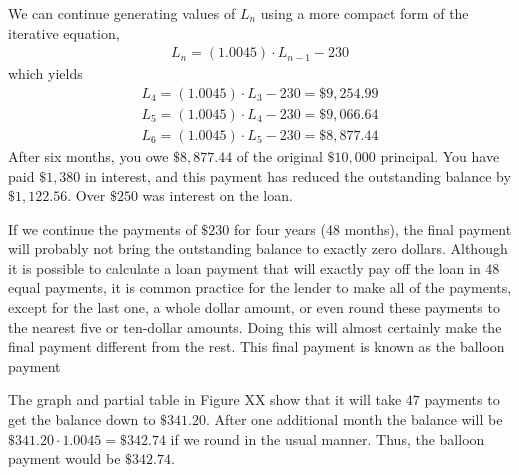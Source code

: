 \documentclass[10pt,]{book}
\theoremstyle{plain}
\theoremstyle{definition}
\theoremstyle{definition}
\theoremstyle{definition}
\numberwithin{equation}{section}
\begin{document}
\par
We can continue generating values of \(L_n\) using a more compact form of the iterative equation,%
%
\begin{gather*}
L_n=(1.0045)\cdot L_{n-1}-230
\end{gather*}
which yields%
%
\begin{gather*}
L_4=(1.0045)\cdot L_3-230=\$9,254.99\\
L_5=(1.0045)\cdot L_4-230=\$9,066.64\\
L_6=(1.0045)\cdot L_5-230=\$8,877.44
\end{gather*}
After six months, you owe \(\$8,877.44\) of the original \(\$10,000\) principal.  You have paid \(\$1,380\) in interest, and this payment has reduced the outstanding balance by \(\$1,122.56\).  Over \(\$250\) was interest on the loan.%
\par
If we continue the payments of \(\$230\) for four years (48 months), the final payment will probably not bring the outstanding balance to exactly zero dollars.  Although it is possible to calculate a loan payment that will exactly pay off the loan in 48 equal payments, it is common practice for the lender to make all of the payments, except for the last one, a whole dollar amount, or even round these payments to the nearest five or ten-dollar amounts. Doing this will almost certainly make the final payment different from the rest.  This final payment is known as the balloon payment%
\par
The graph and partial table in Figure XX show that it will take \(47\) payments to get the balance down to \(\$341.20\).  After one additional month the balance will be \(\$341.20\cdot 1.0045=\$342.74\) if we round in the usual manner.  Thus, the balloon payment would be \(\$342.74\).%
\end{document}
